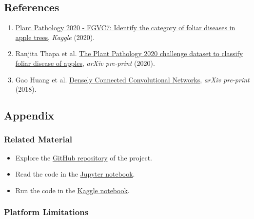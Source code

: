 \documentclass[]{article}
\providecommand{\tightlist}{%
  \setlength{\itemsep}{0pt}\setlength{\parskip}{0pt}}
\begin{document}
\hypertarget{references}{%
\subsection{\texorpdfstring{\textbf{References}}{References}}\label{references}}

\begin{enumerate}
\def\labelenumi{\arabic{enumi}.}
\tightlist
\item
  \href{https://www.kaggle.com/c/plant-pathology-2020-fgvc7}{Plant
  Pathology 2020 - FGVC7: Identify the category of foliar diseases in
  apple trees}, \emph{Kaggle} (2020).
\item
  Ranjita Thapa et al. \href{https://arxiv.org/abs/2004.11958}{The Plant
  Pathology 2020 challenge dataset to classify foliar disease of
  apples}, \emph{arXiv pre-print} (2020).
\item
  Gao Huang et al. \href{https://arxiv.org/abs/1608.06993}{Densely
  Connected Convolutional Networks}, \emph{arXiv pre-print} (2018).
\end{enumerate}

\hypertarget{appendix}{%
\subsection{\texorpdfstring{\textbf{Appendix}}{Appendix}}\label{appendix}}

\hypertarget{additional-material}{%
\subsubsection{Related Material}\label{additional-material}}

\begin{itemize}
\tightlist
\item
  Explore the
  \href{https://github.com/InPhyT/NeuralNetworksProject}{GitHub
  repository} of the project.
\item
  Read the code in the
  \href{https://nbviewer.jupyter.org/github/InPhyT/NeuralNetworksProject/notebook.ipynb}{Jupyter
  notebook}.
\item
  Run the code in the
  \href{https://www.kaggle.com/inphyt2020/neuralnetworksproject}{Kaggle
  notebook}.
\end{itemize}

\hypertarget{platform-limitations}{%
\subsubsection{Platform Limitations}\label{platform-limitations}}
\end{document}
